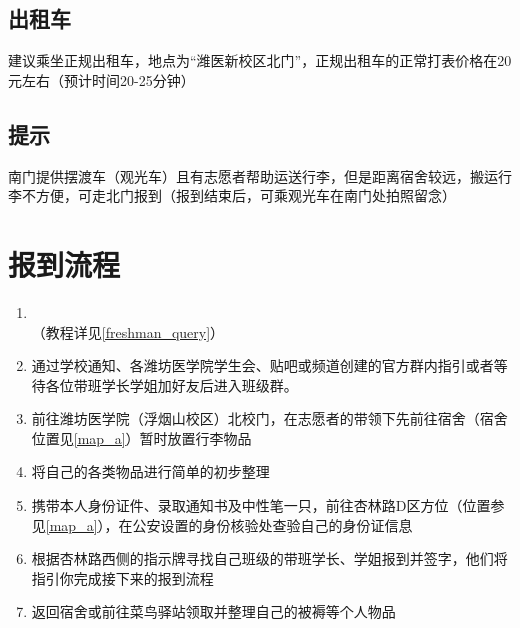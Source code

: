 \subsection[出租车]{出租车}
建议乘坐正规出租车，地点为“潍医新校区北门”，正规出租车的正常打表价格在20元左右（预计时间20-25分钟）

\subsection[提示]{提示}
南门提供摆渡车（观光车）且有志愿者帮助运送行李，但是距离宿舍较远，搬运行李不方便，可走北门报到（报到结束后，可乘观光车在南门处拍照留念）

\section[报到流程]{报到流程}
\begin{enumerate}
      \item \textbf{\\}\footnotemark（教程详见\uline{\ref{freshman_query}}）
      \item 通过学校通知、各潍坊医学院学生会、贴吧或频道创建的官方群内指引或者等待各位带班学长学姐加好友后进入班级群\footnotemark。
      \item 前往潍坊医学院（浮烟山校区）北校门，在志愿者\footnotemark 的带领下先前往宿舍（宿舍位置见\uline{\ref{map_a}}）暂时放置行李物品
      \item 将自己的各类物品进行简单的初步整理
      \item 携带本人身份证件、录取通知书\footnotemark 及中性笔一只，前往杏林路D区方位（位置参见\uline{\ref{map_a}}），在公安设置的身份核验处查验自己的身份证信息
      \item 根据杏林路西侧的指示牌寻找自己班级的带班学长、学姐报到并签字，他们将指引你完成接下来的报到流程\footnotemark
      \item 返回宿舍或前往菜鸟驿站领取并整理自己的被褥等个人物品
\end{enumerate}